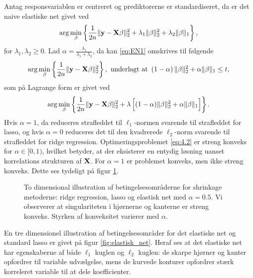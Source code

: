 Antag responsvariablen er centreret og prediktorerne er standardiseret, da er det naive elastiske net givet ved
\begin{align}
\arg \min_{\beta} \cbr{ \frac{1}{2n} \Vert \y - \X \beta \Vert_2^2 + \lambda_1 \Vert \beta \Vert_2^2 + \lambda_2 \Vert \beta \Vert_1}, \label{eq:EN1}
\end{align}
for \(\lambda_1, \lambda_2 \geq 0\).
Lad \(\alpha = \frac{\lambda_1}{\lambda_1 + \lambda_2}\), da kan \eqref{eq:EN1} omskrives til følgende
\begin{align*}
\arg \min_{\beta} \cbr{\frac{1}{2n} \Vert \y - \X \beta \Vert_2^2}, \ \text{underlagt at } \del{1-\alpha} \Vert \beta \Vert_2^2 + \alpha \Vert \beta \Vert_1 \leq t,
\end{align*}
som på Lagrange form er givet ved
\begin{align}
\arg \min_{\beta} \cbr{\frac{1}{2n} \Vert \y - \X \beta \Vert_2^2 + \lambda \sbr{(1- \alpha) \Vert \beta \Vert_2^2 + \alpha \Vert \beta \Vert_1}}. \label{eq:4.2}
\end{align}
Hvis $\alpha=1$, da reduceres strafleddet til $\ell_1$-normen svarende til strafleddet for lasso, og hvis $\alpha=0$ reduceres det til den kvadrerede $\ell_2$-norm svarende til strafleddet for ridge regression.
Optimeringsproblemet  \eqref{eq:4.2} er streng konveks for \(\alpha \in [0,1)\), hvilket betyder, at der eksisterer en entydig løsning uanset korrelations strukturen af $\mathbf{X}$.
For  \(\alpha=1\) er problemet konveks, men ikke streng konveks.
Dette ses tydeligt på figur \ref{fig:elastisk}.
%
\begin{figure}[H]
\centering
\scalebox{0.8}{}
\caption[optional short text]{To dimensional illustration af betingelsesområderne for shrinkage metoderne:  ridge regression,   lasso og  elastisk net med \(\alpha = 0.5\). Vi observerer at singulariteten i hjørnerne og kanterne er streng konveks. Styrken af konveksitet varierer med \(\alpha\).} \label{fig:elastisk}
\end{figure}
%
En tre dimensionel illustration af betingelsesområder for det elastiske net og standard lasso er givet på figur \ref{fig:elastisk_net}.
Heraf ses at det elastiske net har egenskaberne af både $\ell_1$ kuglen og $\ell_2$ kuglen: de skarpe hjørner og kanter opfordrer til variable udvælgelse, mens de kurvede konturer opfordrer stærk korreleret variable til at dele koefficienter.
%
